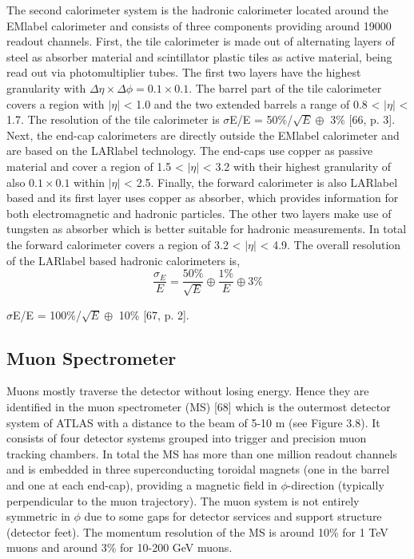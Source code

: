 The second calorimeter system is the hadronic calorimeter located around the \acrshort{EMlabel} calorimeter and consists of three components providing around 19000 readout channels. First, the tile calorimeter is made out of alternating layers of steel as absorber material and scintillator plastic tiles as active material, being read out via photomultiplier tubes. The first two layers have the highest granularity with $\Delta\eta\times\Delta\phi= 0.1\times 0.1$. The barrel part of the tile calorimeter covers a region with $|\eta|$ < 1.0 and the two extended barrels a range of 0.8 < $|\eta|$ < 1.7. The resolution of the tile calorimeter is $\sigma$E/E = 50\%/$\sqrt{E}\oplus$ 3\%  [66, p. 3].
Next, the end-cap calorimeters are directly outside the \acrshort{EMlabel} calorimeter and are based on the \acrshort{LARlabel} technology. The end-caps use copper as passive material and cover a region of 1.5 < $|\eta|$ < 3.2 with their highest granularity of also $0.1\times 0.1$ within $|\eta|$ < 2.5. Finally, the forward calorimeter is also \acrshort{LARlabel} based and its first layer uses copper as absorber, which provides information for both electromagnetic and hadronic particles. The other two layers make use of tungsten as absorber which is better suitable for hadronic measurements. In total the forward calorimeter covers a region of 3.2 < $|\eta|$ < 4.9. The overall resolution of the \acrshort{LARlabel} based hadronic calorimeters is,
\begin{equation}
    \frac{\sigma_E}{E} = \frac{50\%}{\sqrt{E}}\oplus\frac{1\%}{E}\oplus 3\%
\end{equation}


$\sigma$E/E = 100\%/$\sqrt{E}\oplus$ 10\% [67, p. 2].


\subsection{Muon Spectrometer}

Muons mostly traverse the detector without losing energy. Hence they are identified in the muon spectrometer (MS) [68] which is the outermost detector system of ATLAS with a distance to the beam of 5-10 m (see Figure 3.8). It consists of four detector systems grouped into trigger and precision muon tracking chambers. In total the MS has more than one million readout channels and is embedded in three superconducting toroidal magnets (one in the barrel and one at each end-cap), providing a magnetic field in $\phi$-direction (typically perpendicular to the muon trajectory). The muon system is not entirely symmetric in $\phi$ due to some gaps for detector services and support structure (detector feet). The momentum resolution of the MS is around 10\% for 1 TeV muons and around 3\% for 10-200 GeV muons.

